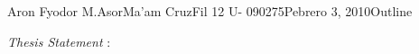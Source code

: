 \documentclass[12pt,letterpaper]{article}
\begin{document}
\begin{mla}{Aron Fyodor M.}{Asor}{Ma'am Cruz}{Fil 12 U- 090275}{Pebrero 3, 2010}{Outline}

	\noindent \textit{Thesis Statement} : 

\end{mla}
\end{document}

